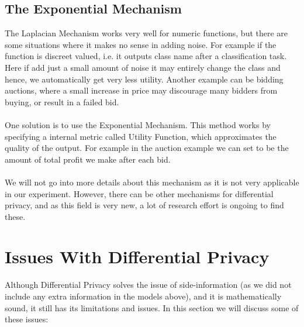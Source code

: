 \documentclass[12pt]{report}
\theoremstyle{named}
\begin{document}
\subsection{The Exponential Mechanism}
The Laplacian Mechanism works very well for numeric functions, but there are some situations where it makes no sense in adding noise. For example if the function is discreet valued, i.e. it outputs class name after a classification task. Here if add just a small amount of noise it may entirely change the class and hence, we automatically get very less utility. Another example can be bidding auctions, where a small increase in price may discourage many bidders from buying, or result in a failed bid.
\paragraph{}
One solution is to use the Exponential Mechanism\cite{mcsherry2007mechanism}. This method works by specifying a internal metric called Utility Function, which approximates the quality of the output. For example in the auction example we can set to be the amount of total profit we make after each bid.


\paragraph{}
We will not go into more details about this mechanism as it is not very applicable in our experiment. However, there can be other mechanisms for differential privacy, and as this field is very new, a lot of research effort is ongoing to find these.

\section{Issues With Differential Privacy}
Although Differential Privacy solves the issue of side-information (as we did not include any extra information in the models above), and it is mathematically sound, it still has its limitations and issues. In this section we will discuss some of these issues:
\end{document}
